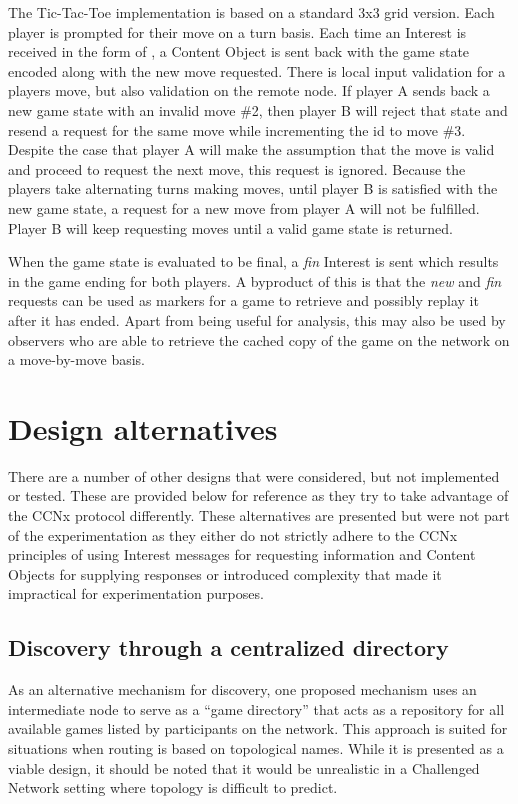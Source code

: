 \documentclass[a4paper,12pt]{report}      %
\begin{document}
The Tic-Tac-Toe implementation is based on a standard 3x3 grid version. Each player is prompted for
their move on a turn basis. Each time an Interest is received in the form of
\texttt{}, a Content Object is sent back with the game state
encoded along with the new move requested. There is local input validation for a players move, but
also validation on the remote node. If player A sends back a new game state with an invalid move \#2,
then player B will reject that state and resend a request for the same move while incrementing the id to move \#3. 
Despite the case that player A will make the assumption that the move is valid and proceed to request the next move, 
this request is ignored. Because the players take alternating turns making moves, until player B is satisfied with the new game state, a
request for a new move from player A will not be fulfilled. Player B will keep requesting moves until a
valid game state is returned.

When the game state is evaluated to be final, a \emph{fin} Interest is sent which results in the game ending for
both players. A byproduct of this is that the \emph{new} and \emph{fin} requests can be used as markers for a game to
retrieve and possibly replay it after it has ended. Apart from being useful for analysis, this may also be
used by observers who are able to retrieve the cached copy of the game on the network on a move-by-move basis.

\section{Design alternatives}

There are a number of other designs that were considered, but not implemented or tested. These are
provided below for reference as they try to take advantage of the CCNx protocol differently. These
alternatives are presented but were not part of the experimentation as they either do not strictly adhere
to the CCNx principles of using Interest messages for requesting information and Content Objects for
supplying responses or introduced complexity that made it impractical for experimentation
purposes.

\subsection{Discovery through a centralized directory}

As an alternative mechanism for discovery, one proposed mechanism uses an intermediate node to
serve as a “game directory” that acts as a repository for all available games listed by participants on the
network. This approach is suited for situations when routing is based on topological names. While it is
presented as a viable design, it should be noted that it would be unrealistic in a Challenged Network setting
where topology is difficult to predict. 
\end{document}
